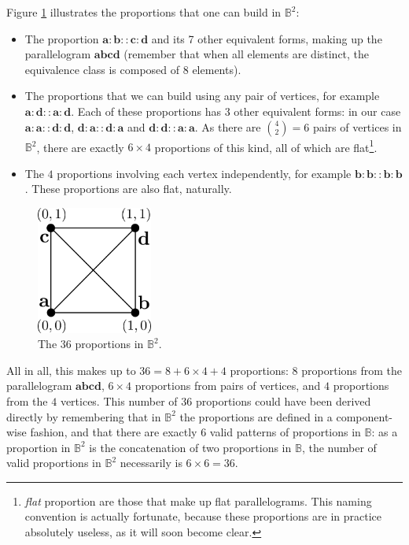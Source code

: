 Figure \ref{FIG:proportions_in_B2} illustrates the proportions that
one can build in $\mathbb{B}^2$:
\begin{itemize}
  \item The proportion $\mathbf{a}: \mathbf{b} :: \mathbf{c} : \mathbf{d}$ and
    its 7 other equivalent forms, making up the parallelogram
    $\mathbf{a}\mathbf{b}\mathbf{c}\mathbf{d}$ (remember that when all elements
    are distinct, the equivalence class is composed of $8$ elements).
  \item The proportions that we can build using any pair of vertices, for
    example $\mathbf{a} : \mathbf{d} :: \mathbf{a} : \mathbf{d}$. Each of these
    proportions has $3$ other equivalent forms: in our case $\mathbf{a} :
    \mathbf{a} :: \mathbf{d} : \mathbf{d}$, $\mathbf{d} : \mathbf{a} ::
    \mathbf{d} : \mathbf{a}$ and $\mathbf{d} : \mathbf{d} :: \mathbf{a} :
    \mathbf{a}$. As there are $\binom{4}{2} = 6$ pairs of vertices in
    $\mathbb{B}^2$, there are exactly $6 \times 4$ proportions of this kind,
    all of which are flat\footnote{\textit{flat} proportion are those that make
    up flat parallelograms. This naming convention is actually fortunate,
    because these proportions are in practice absolutely useless, as it will
    soon become clear.}.
  \item The $4$ proportions involving each vertex independently, for example
    $\mathbf{b}:\mathbf{b}::\mathbf{b}:\mathbf{b}$. These proportions are also
    flat, naturally.
\end{itemize}

\begin{figure}[!h]
\centering
\includegraphics[width=1.5in]{figures/proportions_in_B2.pdf}
  \caption{The $36$ proportions in $\mathbb{B}^2$.}
\label{FIG:proportions_in_B2}
\end{figure}

All in all, this makes up to $36 = 8 + 6 \times 4 + 4$ proportions: $8$
proportions from the parallelogram $\mathbf{a}\mathbf{b}\mathbf{c}\mathbf{d}$,
$6 \times 4$ proportions from pairs of vertices, and $4$ proportions from the
$4$ vertices. This number of $36$ proportions could have been derived directly
by remembering that in $\mathbb{B}^2$ the proportions are defined in a
component-wise fashion, and that there are exactly $6$ valid patterns of
proportions in $\mathbb{B}$: as a proportion in $\mathbb{B}^2$ is the
concatenation of two proportions in $\mathbb{B}$, the number of valid
proportions in $\mathbb{B}^2$ necessarily is $6 \times 6 = 36$.

